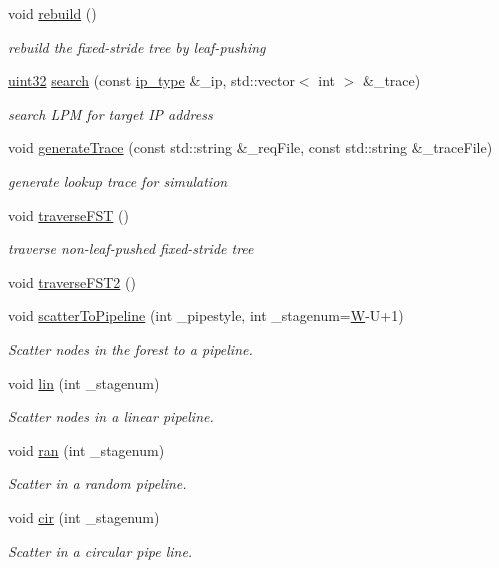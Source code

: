 \begin{DoxyCompactItemize}
void \hyperlink{classRFSTree_afb0a28423f374b968b102c13f51a1cc9}{rebuild} ()
\begin{DoxyCompactList}\small\item\em rebuild the fixed-\/stride tree by leaf-\/pushing \end{DoxyCompactList}\item 
\hyperlink{types_8h_abd01e8e67e3d94cab04ecaaf4f85ac1b}{uint32} \hyperlink{classRFSTree_a5e52e4a054303bec77af7b5ca0183778}{search} (const \hyperlink{classRFSTree_a7cb02a7e27a8d7ff16271e33dbba26eb}{ip\-\_\-type} \&\-\_\-ip, std\-::vector$<$ int $>$ \&\-\_\-trace)
\begin{DoxyCompactList}\small\item\em search L\-P\-M for target I\-P address \end{DoxyCompactList}\item 
void \hyperlink{classRFSTree_ac90ef75f08f670814215e647411375dd}{generate\-Trace} (const std\-::string \&\-\_\-req\-File, const std\-::string \&\-\_\-trace\-File)
\begin{DoxyCompactList}\small\item\em generate lookup trace for simulation \end{DoxyCompactList}\item 
void \hyperlink{classRFSTree_a85ae0780513996ab7434dd23599c1d8a}{traverse\-F\-S\-T} ()
\begin{DoxyCompactList}\small\item\em traverse non-\/leaf-\/pushed fixed-\/stride tree \end{DoxyCompactList}\item 
void \hyperlink{classRFSTree_a1337c77d6e8c591e043aa9827f331155}{traverse\-F\-S\-T2} ()
\item 
void \hyperlink{classRFSTree_a4d65aa9c7cd6e83a9883d6fc19f3cef9}{scatter\-To\-Pipeline} (int \-\_\-pipestyle, int \-\_\-stagenum=\hyperlink{test__u128_8cpp_ab21b528bc38899d04d3a7053e52fb797}{W}-\/U+1)
\begin{DoxyCompactList}\small\item\em Scatter nodes in the forest to a pipeline. \end{DoxyCompactList}\item 
void \hyperlink{classRFSTree_a1aed1bf318c9e2d62f8b206f37111557}{lin} (int \-\_\-stagenum)
\begin{DoxyCompactList}\small\item\em Scatter nodes in a linear pipeline. \end{DoxyCompactList}\item 
void \hyperlink{classRFSTree_a086535290141c419912e8e6563d2364f}{ran} (int \-\_\-stagenum)
\begin{DoxyCompactList}\small\item\em Scatter in a random pipeline. \end{DoxyCompactList}\item 
void \hyperlink{classRFSTree_a2526bccc3c0952277cb9144edf416695}{cir} (int \-\_\-stagenum)
\begin{DoxyCompactList}\small\item\em Scatter in a circular pipe line. \end{DoxyCompactList}\end{DoxyCompactItemize}
